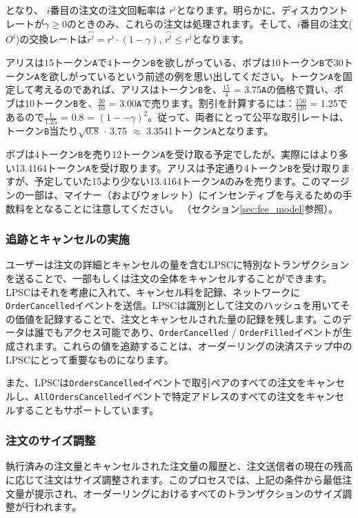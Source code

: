 \documentclass{article}
\begin{document}
\begin{multicols}{2}
となり、 $i$番目の注文の注文回転率は $r^i$となります。明らかに、ディスカウントレートが$\gamma \ge 0$のときのみ、これらの注文は処理されます。そして、$i$番目の注文($O^i$)の交換レートは$\hat{r^i} = r^i \cdot (1-\gamma)$, $\hat{r^i}\le r^i$となります。

アリスは15トークン\verb|A|で4トークン\verb|B|を欲しがっている、ボブは10トークン\verb|B|で30トークン\verb|A|を欲しがっているという前述の例を思い出してください。トークン\verb|A|を固定して考えるのであれば、アリスはトークン\verb|B|を、$\frac{15}{4}$ = 3.75\verb|A|の価格で買い、ボブは10トークン\verb|B|を、$\frac{30}{10}$ = 3.00\verb|A|で売ります。割引を計算するには：$\frac{150}{120}$ = 1.25であるので$\frac{1}{1.25}$ = 0.8 = $(1 −- \gamma)^2$。従って、両者にとって公平な取引レートは、トークン\verb|B|当たり$\sqrt{0.8}$ $\cdot$ 3.75 $\approx$ 3.3541トークン\verb|A|となります。

ボブは4トークン\verb|B|を売り12トークン\verb|A|を受け取る予定でしたが、実際にはより多い13.4164トークン\verb|A|を受け取ります。アリスは予定通り4トークン\verb|B|を受け取りますが、予定していた15より少ない13.4164トークン\verb|A|のみを売ります。このマージンの一部は、マイナー（およびウォレット）にインセンティブを与えるための手数料をとなることに注意してください。 （セクション\ref{sec:fee_model}参照）。

\subsubsection{追跡とキャンセルの実施}

ユーザーは注文の詳細とキャンセルの量を含むLPSCに特別なトランザクションを送ることで、一部もしくは注文の全体をキャンセルすることができます。LPSCはそれを考慮に入れて、キャンセル料を記録、ネットワークに\verb|OrderCancelled|イベントを送信。LPSCは識別として注文のハッシュを用いてその価値を記録することで、注文とキャンセルされた量の記録を残します。このデータは誰でもアクセス可能であり、\verb|OrderCancelled| / \verb|OrderFilled|イベントが生成されます。これらの値を追跡することは、オーダーリングの決済ステップ中のLPSCにとって重要なものになります。

また、LPSCは\verb|OrdersCancelled|イベントで取引ペアのすべての注文をキャンセルし、\verb|AllOrdersCancelled|イベントで特定アドレスのすべての注文をキャンセルすることもサポートしています。


\subsubsection{注文のサイズ調整\label{sec:order_scaling}}
執行済みの注文量とキャンセルされた注文量の履歴と、注文送信者の現在の残高に応じて注文はサイズ調整されます。このプロセスでは、上記の条件から最低注文量が提示され、オーダーリングにおけるすべてのトランザクションのサイズ調整が行われます。



\end{multicols}
\end{document}
